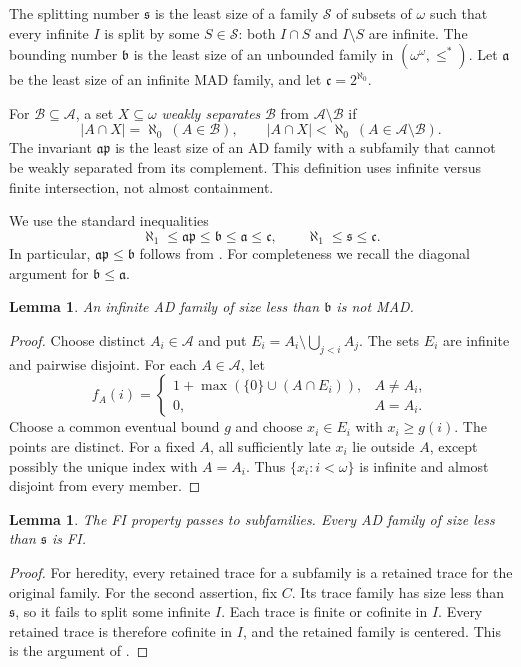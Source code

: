 \documentclass[11pt,letterpaper]{article}
\newtheorem{lemma}[theorem]{Lemma}
\theoremstyle{definition}
\theoremstyle{remark}
\newcommand{\s}{\mathfrak{s}}
\newcommand{\bnum}{\mathfrak{b}}
\newcommand{\anum}{\mathfrak{a}}
\newcommand{\ap}{\mathfrak{ap}}
\newcommand{\cont}{\mathfrak{c}}
\newcommand{\A}{\mathcal{A}}
\begin{document}
The splitting number $\s$ is the least size of a family $\mathcal S$ of
subsets of $\omega$ such that every infinite $I$ is split by some
$S\in\mathcal S$: both $I\cap S$ and $I\setminus S$ are infinite.
The bounding number $\bnum$ is the least size of an unbounded family in
$(\omega^\omega,\leq^*)$. Let $\anum$ be the least size of an infinite MAD
family, and let $\cont=2^{\aleph_0}$.

For $\mathcal B\subseteq\A$, a set $X\subseteq\omega$ \emph{weakly separates}
$\mathcal B$ from $\A\setminus\mathcal B$ if
\[
 |A\cap X|=\aleph_0\ (A\in\mathcal B),\qquad
 |A\cap X|<\aleph_0\ (A\in\A\setminus\mathcal B).
\]
The invariant $\ap$ is the least size of an AD family with a subfamily
that cannot be weakly separated from its complement. This definition uses
infinite versus finite intersection, not almost containment.

We use the standard inequalities
\begin{equation}\label{eq:bounds}
 \aleph_1\leq\ap\leq\bnum\leq\anum\leq\cont,
 \qquad \aleph_1\leq\s\leq\cont.
\end{equation}
In particular, $\ap\leq\bnum$ follows from \cite[Theorem~2]{BMZ}.
For completeness we recall the diagonal argument for $\bnum\leq\anum$.

\begin{lemma}\label{lem:ba}
An infinite AD family of size less than $\bnum$ is not MAD.
\end{lemma}
\begin{proof}
Choose distinct $A_i\in\A$ and put $E_i=A_i\setminus\bigcup_{j<i}A_j$.
The sets $E_i$ are infinite and pairwise disjoint. For each $A\in\A$, let
\[
 f_A(i)=
 \begin{cases}
 1+\max(\{0\}\cup(A\cap E_i)),&A\ne A_i,\\
 0,&A=A_i.
 \end{cases}
\]
Choose a common eventual bound $g$ and choose $x_i\in E_i$ with $x_i\geq g(i)$.
The points are distinct. For a fixed $A$, all sufficiently late $x_i$ lie
outside $A$, except possibly the unique index with $A=A_i$.
Thus $\{x_i:i<\omega\}$ is infinite and almost disjoint from every member.
\end{proof}

\begin{lemma}\label{lem:small}
The FI property passes to subfamilies. Every AD family of size less than
$\s$ is FI.
\end{lemma}
\begin{proof}
For heredity, every retained trace for a subfamily is a retained trace for
the original family. For the second assertion, fix $C$. Its trace family
has size less than $\s$, so it fails to split some infinite $I$.
Each trace is finite or cofinite in $I$. Every retained trace is therefore
cofinite in $I$, and the retained family is centered.
This is the argument of \cite[Theorem~3.1]{CR}.
\end{proof}
\end{document}
